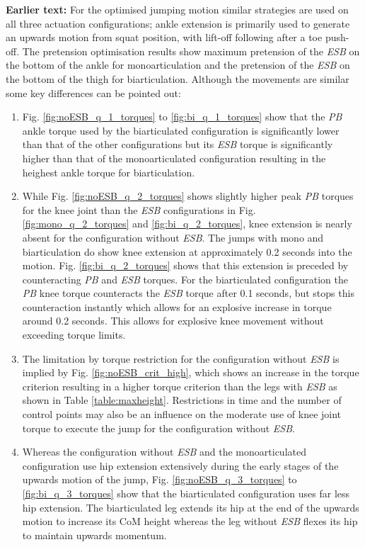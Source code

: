 \documentclass[letterpaper, 10 pt, conference]{ieeeconf}  %
\begin{document}
\textbf{Earlier text:}
For the optimised jumping motion similar strategies are used on all three actuation configurations; ankle extension is primarily used to generate an upwards motion from squat position, with lift-off following after a toe push-off. The pretension optimisation results show maximum pretension of the \textit{ESB} on the bottom of the ankle for monoarticulation and the pretension of the \textit{ESB} on the bottom of the thigh for biarticulation. Although the movements are similar some key differences can be pointed out:

\begin{enumerate}
	\item Fig. \ref{fig:noESB_q_1_torques} to \ref{fig:bi_q_1_torques} show that the \textit{PB} ankle torque used by the biarticulated configuration is significantly lower than that of the other configurations but its \textit{ESB} torque is significantly higher than that of the monoarticulated configuration resulting in the heighest ankle torque for biarticulation. 
	
	\item While Fig. \ref{fig:noESB_q_2_torques} shows slightly higher peak \textit{PB} torques for the knee joint than the \textit{ESB} configurations in Fig. \ref{fig:mono_q_2_torques} and \ref{fig:bi_q_2_torques}, knee extension is nearly absent for the configuration without \textit{ESB}. The jumps with mono and biarticulation do show knee extension at approximately 0.2 seconds into the motion. Fig. \ref{fig:bi_q_2_torques} shows that this extension is preceded by counteracting \textit{PB} and \textit{ESB} torques. For the biarticulated configuration the \textit{PB} knee torque counteracts the \textit{ESB} torque after 0.1 seconds, but stops this counteraction instantly which allows for an explosive increase in torque around 0.2 seconds. This allows for explosive knee movement without exceeding torque limits.
	
	\item The limitation by torque restriction for the configuration without \textit{ESB} is implied by Fig. \ref{fig:noESB_crit_high}, which shows an increase in the torque criterion resulting in a higher torque criterion than the legs with \textit{ESB} as shown in Table \ref{table:maxheight}. Restrictions in time and the number of control points may also be an influence on the moderate use of knee joint torque to execute the jump for the configuration without \textit{ESB}.
	
	\item Whereas the configuration without \textit{ESB} and the monoarticulated configuration use hip extension extensively during the early stages of the upwards motion of the jump, Fig. \ref{fig:noESB_q_3_torques} to \ref{fig:bi_q_3_torques} show that the biarticulated configuration uses far less hip extension. The biarticulated leg extends its hip at the end of the upwards motion to increase its CoM height whereas the leg without \textit{ESB} flexes its hip to maintain upwards momentum.
	

\end{enumerate}
\end{document}
